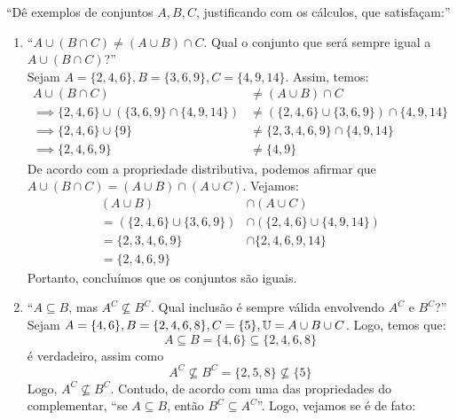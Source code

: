 \enquote{Dê exemplos de conjuntos $A, B, C$, justificando com os cálculos, que satisfaçam:}
    \begin{enumerate}
        \item \enquote{$A \cup (B \cap C) \ne (A \cup B) \cap C$. Qual o conjunto que será sempre igual a $A \cup (B \cap C)$?} \\
        Sejam $A = \{ 2, 4, 6 \}, B = \{3, 6, 9 \}, C = \{4, 9, 14\}$. Assim, temos: 
        \begin{align*}
            A \cup (B \cap C) &\ne (A \cup B) \cap C \\ \implies
            \{ 2, 4, 6 \} \cup (\{3, 6, 9 \} \cap \{4, 9, 14\}) &\ne (\{ 2, 4, 6 \} \cup \{3, 6, 9 \}) \cap \{4, 9, 14\} \\
            \implies
            \{2, 4, 6\} \cup \{9\} &\ne \{2, 3, 4, 6, 9\} \cap \{4, 9, 14\} \\
            \implies
            \{2, 4, 6, 9\} &\ne \{4, 9\}
        \end{align*}
        De acordo com a propriedade distributiva, podemos afirmar que $A \cup (B \cap C) = (A \cup B) \cap (A \cup C)$. Vejamos:
        \begin{align*}
            (A \cup B) &\cap (A \cup C) \\ =
            (\{ 2, 4, 6 \} \cup \{3, 6, 9 \}) &\cap (\{ 2, 4, 6 \} \cup \{4, 9, 14\}) \\ =
            \{ 2, 3, 4, 6, 9\} &\cap \{2, 4, 6, 9, 14 \} \\ = \{ 2, 4, 6, 9\}
        \end{align*}
        Portanto, concluímos que os conjuntos são iguais.
        \item \enquote{$A \subseteq B$, mas $A^C \nsubseteq B^C$. Qual inclusão é sempre válida envolvendo $A^C$ e $B^C$?} \\
        Sejam $A = \{4, 6\}, B = \{2, 4, 6, 8 \}, C = \{5\}, \mathbb U = A \cup B \cup C$. Logo, temos que:
        \begin{displaymath}
            A \subseteq B = \{4, 6\} \subseteq \{2, 4, 6, 8\}
        \end{displaymath}
        é verdadeiro, assim como
        \begin{displaymath}
            A^C \nsubseteq B^C = \{2, 5, 8\} \nsubseteq \{5\}
        \end{displaymath}
        Logo, $A^C \nsubseteq B^C$. Contudo, de acordo com uma das propriedades do complementar, \enquote{se $A \subseteq B$, então $B^C \subseteq A^C$}. Logo, vejamos se é de fato:

\end{enumerate}
